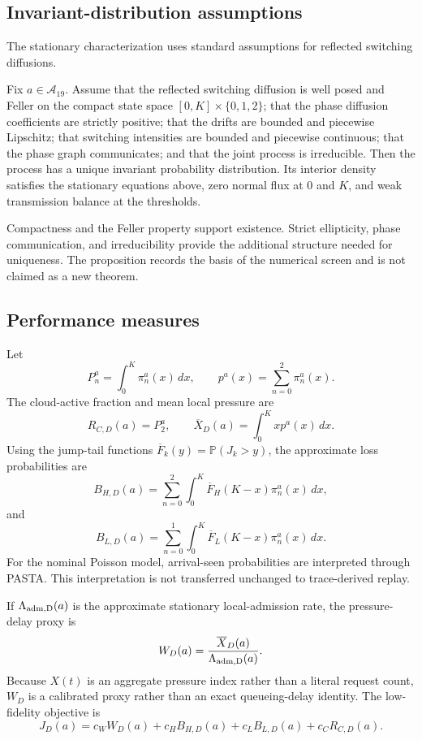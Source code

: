\documentclass[futureinternet,supfile,submit,moreauthors]{Definitions/mdpi}
\newcommand{\Aset}{\mathcal A}
\newcommand{\Prob}{\mathbb P}
\begin{document}
\subsection{Invariant-distribution assumptions}

The stationary characterization uses standard assumptions for reflected
switching diffusions.

\begin{Proposition}
Fix \(a\in\Aset_{19}\). Assume that the reflected switching diffusion is well
posed and Feller on the compact state space
\([0,K]\times\{0,1,2\}\); that the phase diffusion coefficients are strictly
positive; that the drifts are bounded and piecewise Lipschitz; that switching
intensities are bounded and piecewise continuous; that the phase graph
communicates; and that the joint process is irreducible. Then the process has
a unique invariant probability distribution. Its interior density satisfies
the stationary equations above, zero normal flux at \(0\) and \(K\), and weak
transmission balance at the thresholds.
\end{Proposition}

Compactness and the Feller property support existence. Strict ellipticity,
phase communication, and irreducibility provide the additional structure
needed for uniqueness. The proposition records the basis of the numerical
screen and is not claimed as a new theorem.

\subsection{Performance measures}

Let
\[
P_n^a=\int_0^K\pi_n^a(x)\,dx,
\qquad
p^a(x)=\sum_{n=0}^{2}\pi_n^a(x).
\]
The cloud-active fraction and mean local pressure are
\[
R_{C,D}(a)=P_2^a,
\qquad
\overline X_D(a)=\int_0^Kxp^a(x)\,dx.
\]
Using the jump-tail functions
\(\overline F_k(y)=\Prob(J_k>y)\), the approximate loss probabilities are
\[
B_{H,D}(a)
=
\sum_{n=0}^{2}\int_0^K
\overline F_H(K-x)\pi_n^a(x)\,dx,
\]
and
\[
B_{L,D}(a)
=
\sum_{n=0}^{1}\int_0^K
\overline F_L(K-x)\pi_n^a(x)\,dx.
\]
For the nominal Poisson model, arrival-seen probabilities are interpreted
through PASTA. This interpretation is not transferred unchanged to
trace-derived replay.

If \(\Lambda_{\rm adm,D}(a)\) is the approximate stationary local-admission
rate, the pressure-delay proxy is
\[
W_D(a)
=
\frac{\overline X_D(a)}
{\Lambda_{\rm adm,D}(a)}.
\]
Because \(X(t)\) is an aggregate pressure index rather than a literal request
count, \(W_D\) is a calibrated proxy rather than an exact queueing-delay
identity. The low-fidelity objective is
\[
J_D(a)
=
c_WW_D(a)
+
c_HB_{H,D}(a)
+
c_LB_{L,D}(a)
+
c_CR_{C,D}(a).
\]
\end{document}
